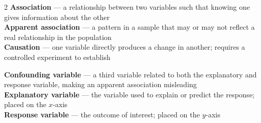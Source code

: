 \documentclass[aspectratio=169, 11pt]{beamer}
\begin{document}
{
\begin{frame}[t, plain]
  \vspace{1.05cm}\par
  \hspace{0.4cm}%
  \begin{minipage}{0.93\textwidth}
    \vspace{1em}
    \footnotesize
    \begin{multicols}{2}
      \textbf{\color{greenacc}Association} --- a relationship between two variables
        such that knowing one gives information about the other\\[4pt]
      \textbf{\color{greenacc}Apparent association} --- a pattern in a sample that may
        or may not reflect a real relationship in the population\\[4pt]
      \textbf{\color{greenacc}Causation} --- one variable directly produces a change in
        another; requires a controlled experiment to establish\\[4pt]

      \columnbreak

      \textbf{\color{greenacc}Confounding variable} --- a third variable related to both
        the explanatory and response variable, making an apparent association misleading\\[4pt]
      \textbf{\color{greenacc}Explanatory variable} --- the variable used to explain or
        predict the response; placed on the $x$-axis\\[4pt]
      \textbf{\color{greenacc}Response variable} --- the outcome of interest;
        placed on the $y$-axis
    \end{multicols}
  \end{minipage}
\end{frame}
}
\end{document}
